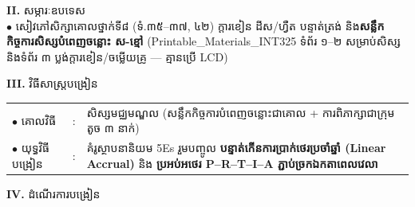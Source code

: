 \documentclass[a4paper,10pt]{article}
\newcommand{\en}[1]{{\TimesEn #1}}
\begin{document}
{%
\textbf{II.} {\muol សម្ភារៈឧបទេស}\\[1pt]
\hspace*{0.55cm}$\bullet$ \hspace{0.35cm} សៀវភៅសិក្សាគោលថ្នាក់ទី៨ (ទំ.៣៥–៣៧, ៤២) ក្ដារខៀន ដីស/ហ្វឺត បន្ទាត់ត្រង់ និង\textbf{សន្លឹកកិច្ចការសិស្សបំពេញចន្លោះ ស-ខ្មៅ} (\en{Printable\_Materials\_INT325} ទំព័រ ១–២ សម្រាប់សិស្ស និងទំព័រ ៣ ប្លង់ក្ដារខៀន/ចម្លើយគ្រូ — គ្មានប្រើ \en{LCD})

\vspace{2pt}

\textbf{III.} {\muol វិធីសាស្រ្តបង្រៀន}\\[1pt]
\hspace*{0.45cm}%
\begin{tabular}{@{}l l L{14.85cm}@{}}
  $\bullet$ \hspace{0.25cm} គោលវិធី & : & សិស្សមជ្ឈមណ្ឌល (សន្លឹកកិច្ចការបំពេញចន្លោះជាគោល + ការពិភាក្សាជាក្រុមតូច ៣ នាក់) \\
  $\bullet$ \hspace{0.25cm} យុទ្ធវិធីបង្រៀន & : & គំរូស្ថាបនានិយម \en{5Es} រួមបញ្ចូល \textbf{បន្ទាត់កើនការប្រាក់ថេរប្រចាំឆ្នាំ (\en{Linear Accrual})} និង \textbf{ប្រអប់អថេរ \en{P--R--T--I--A} ភ្ជាប់ច្រកឯកតាពេលវេលា} \\
\end{tabular}
}

\vspace{2pt}

\textbf{IV.} {\muol ដំណើរការបង្រៀន}
\end{document}
